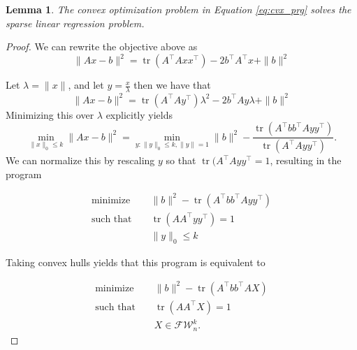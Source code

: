 \documentclass[a4paper]{article}
\newcommand{\FW}{\mathcal{F}\mathcal{W}}
\newtheorem{lemma}{Lemma}
\DeclareMathOperator*{\tr}{tr}
\begin{document}
\begin{lemma}\label{lem:convex}
    The convex optimization problem in Equation \ref{eq:cvx_prg} solves the sparse linear regression problem.
\end{lemma}
\begin{proof}
    We can rewrite the objective above as
    \[
        \|Ax - b\|^2 = \tr(A^{\intercal}Axx^{\intercal}) - 2b^{\intercal}A^{\intercal}x + \|b\|^2
    \]

    Let $\lambda = \|x\|$, and let $y = \frac{x}{\lambda}$ then we have that 
    \[
        \|Ax - b\|^2 = \tr(A^{\intercal}Ay^{\intercal})\lambda^2 - 2b^{\intercal}Ay\lambda + \|b\|^2
    \]
    Minimizing this over $\lambda$ explicitly yields
    \[
        \min_{\|x\|_0 \le k} \|Ax - b\|^2 = \min_{y :\|y\|_0 \le k, \|y\| = 1}  \|b\|^2 - \frac{\tr(A^{\intercal}bb^{\intercal}Ayy^{\intercal})}{\tr(A^{\intercal}Ayy^{\intercal})}.
    \]
    We can normalize this by rescaling $y$ so that $\tr(A^{\intercal}Ayy^{\intercal} = 1$, resulting in the program
        
    \begin{equation}
    \begin{aligned}
        \text{minimize} &&\|b\|^2 - \tr(A^{\intercal}bb^{\intercal}Ayy^{\intercal})\\
        \text{such that } && \tr(AA^{\intercal}yy^{\intercal}) = 1\\
                          && \|y\|_0 \le k
    \end{aligned}
    \end{equation}

    Taking convex hulls yields that this program is equivalent to
        
    \begin{equation}
    \begin{aligned}
        \text{minimize} &&\|b\|^2 - \tr(A^{\intercal}bb^{\intercal}AX)\\
        \text{such that } && \tr(AA^{\intercal}X) = 1\\
                          && X \in \FW^k_n.
    \end{aligned}
    \end{equation}

\end{proof}
\end{document}
